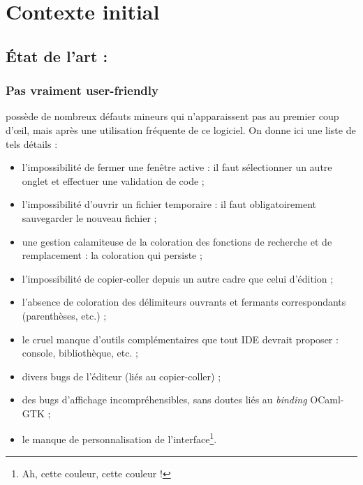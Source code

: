 \newcommand{\qcodeedit}{QCodeEdit}
\newcommand{\qtermwidget}{QTermWidget}
\newcommand{\stdout}{\texttt{stdout}}
\newcommand{\stderr}{\texttt{stderr}}

\section{Contexte initial}

    \subsection{État de l'art : \coqide{}}

        \subsubsection{Pas vraiment user-friendly}

        \coqide{} possède de nombreux défauts mineurs qui n'apparaissent pas au premier coup d'\oe{}il, mais après une utilisation fréquente de ce logiciel.
        On donne ici une liste de tels détails :
        \begin{itemize}
          \item l'impossibilité de fermer une fenêtre active : il faut sélectionner un autre onglet et effectuer une validation de code ;
          \item l'impossibilité d'ouvrir un fichier temporaire : il faut obligatoirement sauvegarder le nouveau fichier ;
          \item une gestion calamiteuse de la coloration des fonctions de recherche et de remplacement : la coloration qui persiste ;
          \item l'impossibilité de copier-coller depuis un autre cadre que celui d'édition ;
          \item l'absence de coloration des délimiteurs ouvrants et fermants correspondants (parenthèses, etc.) ;
          \item le cruel manque d'outils complémentaires que tout IDE devrait proposer : console, bibliothèque, etc. ;
          \item divers bugs de l'éditeur (liés au copier-coller) ;
          \item des bugs d'affichage incompréhensibles, sans doutes liés au \emph{binding} OCaml-GTK ;
          \item le manque de personnalisation de l'interface\footnote{Ah, cette couleur, cette couleur !}.
        \end{itemize}

